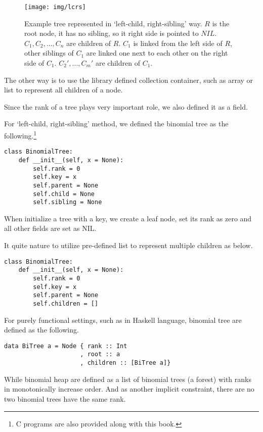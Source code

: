 \documentclass{article}
\begin{document}
\begin{figure}[htbp]
  \centering
  \texttt{[image: img/lcrs]}
  \caption{Example tree represented in `left-child, right-sibling' way. $R$ is the root node, it has no sibling, so it right side is pointed to $NIL$. $C_1, C_2, ..., C_n$ are children of $R$. $C_1$ is linked from the left side of $R$, other siblings of $C_1$ are linked one next to each other on the right side of $C_1$. $C_2', ..., C_m'$ are children of $C_1$.} \label{fig:lcrs}
\end{figure}

The other way is to use the library defined collection container, such
as array or list to represent all children of a node.

Since the rank of a tree plays very important role, we also defined
it as a field.

For `left-child, right-sibling' method, we defined the binomial tree
as the following.\footnote{C programs are also provided along with this book.}

\lstset{language=Python}
\begin{lstlisting}
class BinomialTree:
    def __init__(self, x = None):
        self.rank = 0
        self.key = x
        self.parent = None
        self.child = None
        self.sibling = None
\end{lstlisting}

When initialize a tree with a key, we create a leaf node, set its rank
as zero and all other fields are set as NIL.

It quite nature to utilize pre-defined list to represent multiple children
as below.

\begin{lstlisting}
class BinomialTree:
    def __init__(self, x = None):
        self.rank = 0
        self.key = x
        self.parent = None
        self.children = []
\end{lstlisting}

For purely functional settings, such as in Haskell language, binomial tree
are defined as the following.

\lstset{language=Haskell}
\begin{lstlisting}
data BiTree a = Node { rank :: Int
                     , root :: a
                     , children :: [BiTree a]}
\end{lstlisting}

While binomial heap are defined as a list of binomial trees (a forest) with
ranks in monotonically increase order. And as another implicit constraint,
there are no two binomial trees have the same rank.
\end{document}
